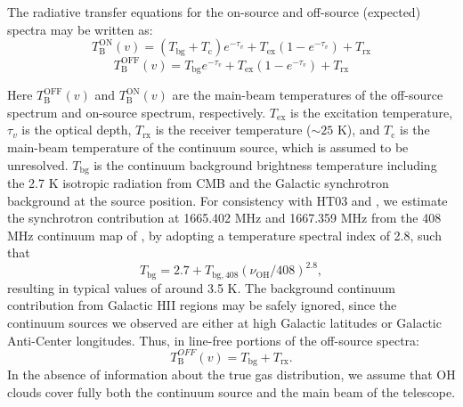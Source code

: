 \documentclass[preprint]{emulateapj}
\begin{document}
The radiative transfer equations for the on-source and off-source (expected) spectra %
may be written as:
\begin{equation}
T_\mathrm{B}^\mathrm{ON}(v) =(T_\mathrm{bg}+T_\mathrm{c})e^{-\tau_{v}} + T_\mathrm{ex}(1-e^{-\tau_{v}}) + T_\mathrm{rx}
\label{eq_ton}
\end{equation}
\begin{equation}
T_\mathrm{B}^\mathrm{OFF}(v)=T_\mathrm{bg}e^{-\tau_{v}} + T_\mathrm{ex}(1-e^{-\tau_{v}}) + T_\mathrm{rx}
\label{eq_toff} 
\end{equation}

\noindent Here $T_\mathrm{B}^\mathrm{OFF} (v)$ and $T_\mathrm{B}^\mathrm{ON} (v)$ are the main-beam temperatures of the off-source spectrum and on-source spectrum, respectively. $T_\mathrm{ex}$ is the excitation temperature, $\tau_{v}$ is the optical depth, $T_\mathrm{rx}$ is the receiver temperature ($\sim25$ K), and $T_\mathrm{c}$ is the main-beam temperature of the continuum source, which is assumed to be unresolved. %
$T_\mathrm{bg}$ is the continuum background brightness temperature including the 2.7 K isotropic radiation from CMB and the Galactic synchrotron background at the source position. For consistency with HT03 and \citet{Li2017}, we estimate the synchrotron contribution at 1665.402 MHz and 1667.359 MHz from the 408 MHz continuum map of \citet{Haslam1982}, by adopting a temperature spectral index of 2.8, such that
\begin{equation}
T_\mathrm{bg} = 2.7 + T_\mathrm{bg,408}(\nu_\mathrm{OH}/408)^{2.8},
\label{eq4c} 
\end{equation}
\noindent resulting in typical values of around 3.5 K. The  background continuum contribution from Galactic HII regions may be safely ignored, since the continuum sources we observed are either at high Galactic latitudes or Galactic Anti-Center longitudes. %
Thus, in line-free portions of the off-source spectra:
\begin{equation}
T_\mathrm{B}^{OFF}(v)= T_\mathrm{bg} + T_\mathrm{rx}.
\label{eq_toff_offline}
\end{equation}
In the absence of information about the true gas distribution, we assume that OH clouds cover fully both the continuum source and the main beam of the telescope. %
\end{document}
